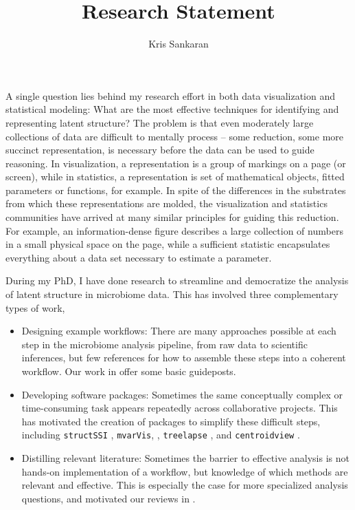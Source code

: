 \documentclass{article}
\title{Research Statement}
\author{Kris Sankaran}
\begin{document}
\maketitle

A single question lies behind my research effort in both data visualization and
statistical modeling: What are the most effective techniques for identifying and
representing latent structure? The problem is that even moderately large
collections of data are difficult to mentally process -- some reduction, some
more succinct representation, is necessary before the data can be used to guide
reasoning. In visualization, a representation is a group of markings on a page
(or screen), while in statistics, a representation is set of mathematical
objects, fitted parameters or functions, for example. In spite of the
differences in the substrates from which these representations are molded, the
visualization and statistics communities have arrived at many similar principles
for guiding this reduction. For example, an information-dense figure describes a
large collection of numbers in a small physical space on the page, while a
sufficient statistic encapsulates everything about a data set necessary to
estimate a parameter.

During my PhD, I have done research to streamline and democratize the analysis
of latent structure in microbiome data. This has involved three complementary
types of work,
\begin{itemize}
\item Designing example workflows: There are many approaches possible at each
  step in the microbiome analysis pipeline, from raw data to scientific
  inferences, but few references for how to assemble these steps into a coherent
  workflow. Our work in \citep{Callahan2016, Fukuyama2017} offer some basic
  guideposts.
\item Developing software packages: Sometimes the same conceptually complex or
  time-consuming task appears repeatedly across collaborative projects. This has
  motivated the creation of packages to simplify these difficult steps,
  including \texttt{structSSI} \citep{sankaran2014structssi}, \texttt{mvarVis},
  \citep{mvarvis}, \texttt{treelapse} \citep{Sankaran2017}, and
  \texttt{centroidview} \citep{centroidview}.
\item Distilling relevant literature: Sometimes the barrier to effective
  analysis is not hands-on implementation of a workflow, but knowledge of which
  methods are relevant and effective. This is especially the case for more
  specialized analysis questions, and motivated our reviews in
  \citep{sankaran2017latent, sankaran2017inference, sankaran2017survey}.
\end{itemize}
\end{document}
